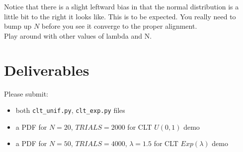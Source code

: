 \begin{fullwidth}
\noindent {} 

Notice that there is a slight leftward bias in that the normal distribution is a little bit to the right it looks like. This is to be expected. You really need to bump up $N$ before you see it converge to the proper alignment.\\

\step Play around with other values of lambda and N.

\section{Deliverables}

Please submit:

\begin{itemize}
\item both {\tt clt\_unif.py}, {\tt clt\_exp.py} files
\item a PDF for $N=20$, $TRIALS=2000$ for CLT $U(0,1)$ demo
\item a PDF for $N=50$, $TRIALS=4000$, $\lambda=1.5$ for CLT $Exp(\lambda)$ demo
\end{itemize}

\end{fullwidth}
